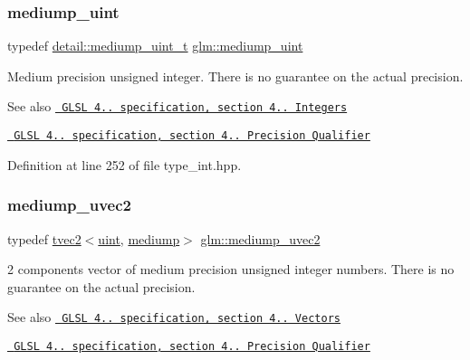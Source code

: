 \subsubsection{\texorpdfstring{mediump\_uint}{mediump\_uint}}
{\footnotesize\ttfamily typedef \mbox{\hyperlink{namespaceglm_1_1detail_a98f572e92099cc1b5740f1ccf1c80f8d}{detail\+::mediump\+\_\+uint\+\_\+t}} \mbox{\hyperlink{group__core__precision_ga08ae38ad78ade3539fdd1d25052b8c51}{glm\+::mediump\+\_\+uint}}}

Medium precision unsigned integer. There is no guarantee on the actual precision.

\begin{DoxySeeAlso}{See also}
\href{http://www.opengl.org/registry/doc/GLSLangSpec.4.20.8.pdf}{\texttt{ G\+L\+SL 4.. specification, section 4.. Integers}} 

\href{http://www.opengl.org/registry/doc/GLSLangSpec.4.20.8.pdf}{\texttt{ G\+L\+SL 4.. specification, section 4.. Precision Qualifier}} 
\end{DoxySeeAlso}


Definition at line 252 of file type\+\_\+int.\+hpp.

\mbox{\label{group__core__precision_ga7ec96113b08a8435fd80dd623ffe3e05}} 
\subsubsection{\texorpdfstring{mediump\_uvec2}{mediump\_uvec2}}
{\footnotesize\ttfamily typedef \mbox{\hyperlink{structglm_1_1tvec2}{tvec2}}$<$\mbox{\hyperlink{group__core__precision_ga4fd29415871152bfb5abd588334147c8}{uint}}, \mbox{\hyperlink{namespaceglm_a0f04f086094c747d227af4425893f545a6416f3ea0c9025fb21ed50c4d6620482}{mediump}}$>$ \mbox{\hyperlink{group__core__precision_ga7ec96113b08a8435fd80dd623ffe3e05}{glm\+::mediump\+\_\+uvec2}}}

2 components vector of medium precision unsigned integer numbers. There is no guarantee on the actual precision.

\begin{DoxySeeAlso}{See also}
\href{http://www.opengl.org/registry/doc/GLSLangSpec.4.20.8.pdf}{\texttt{ G\+L\+SL 4.. specification, section 4.. Vectors}} 

\href{http://www.opengl.org/registry/doc/GLSLangSpec.4.20.8.pdf}{\texttt{ G\+L\+SL 4.. specification, section 4.. Precision Qualifier}} 
\end{DoxySeeAlso}


